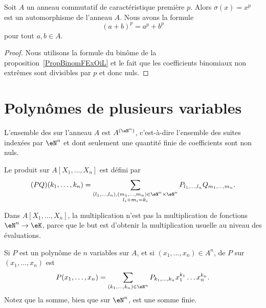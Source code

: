 \begin{proposition}     \label{Propqrrdem}
	Soit \( A\) un anneau commutatif de caractéristique première \( p\). Alors \( \sigma(x)=x^p\) est un automorphisme de l'anneau \( A\). Nous avons la formule
	\begin{equation}
		(a+b)^p=a^p+b^p
	\end{equation}
	pour tout \( a,b\in A\).
\end{proposition}

\begin{proof}
	Nous utilisons la formule du binôme de la proposition~\ref{PropBinomFExOiL} et le fait que les coefficients binomiaux non extrêmes sont divisibles par \( p\) et donc nuls.
\end{proof}

\section{Polynômes de plusieurs variables}

\begin{definition}      \label{DEFooZNHOooCruuwI}
	L'ensemble des  sur l'anneau \( A\) est \( A^{(\eN^n)}\), c'est-à-dire l'ensemble des suites indexées par \( \eN^n\) et dont seulement une quantité finie de coefficients sont non nuls.

	Le produit sur \( A[X_1,\ldots, X_n]\) est défini par
	\begin{equation}
		(PQ)(k_1,\ldots, k_n)=\sum_{\substack{ (l_1,\ldots, l_n),(m_1,\ldots, m_n)\in \eN^n\times \eN^n   \\l_i+m_i=k_i}}P_{l_1,\ldots, l_n}Q_{m_1,\ldots, m_n}.
	\end{equation}
\end{definition}

\begin{normaltext}
	Dans \( A[X_1,\ldots, X_n]\), la multiplication n'est pas la multiplication de fonctions \( \eN^n\to \eK\), parce que le but est d'obtenir la multiplication usuelle au niveau des évaluations.
\end{normaltext}

\begin{definition}
	Si \( P\) est un polynôme de \( n\) variables sur \( A\), et si \( (x_1,\ldots, x_n)\in A^n\),  de \( P\) sur \( (x_1,\ldots, x_n)\) est
	\begin{equation}
		P(x_1,\ldots, x_n)=\sum_{(k_1,\ldots, k_n)\in \eN^n}P_{k_1,\ldots, k_n}x_1^{k_1}\ldots x_n^{k_n}.
	\end{equation}
	Notez que la somme, bien que sur \( \eN^n\), est une somme finie.
\end{definition}

